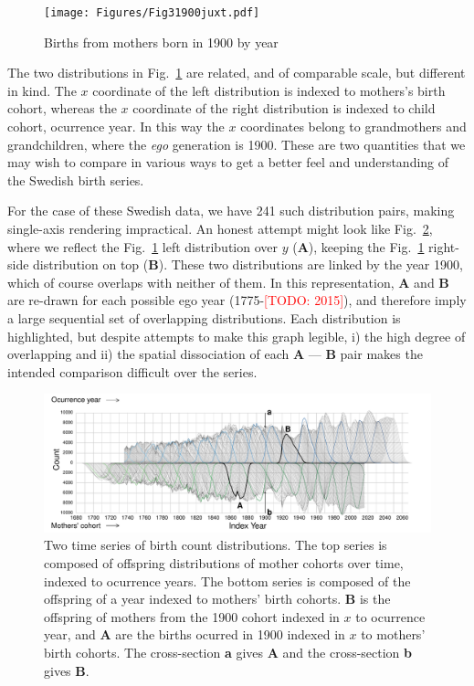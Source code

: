 \documentclass{article}
\renewcommand{\todo}[1]{\textcolor{red}{[TODO: #1]}}
\begin{document}
\begin{figure}[ht!]
 \centering
        \texttt{[image: Figures/Fig31900juxt.pdf]}
        \caption{Births from mothers born in 1900 by year}
          \label{fig:juxt}
\end{figure}

The two distributions in Fig.~\ref{fig:juxt} are related, and of comparable scale, but different in kind. The $x$ coordinate of the left distribution is indexed to mothers's birth cohort, whereas the $x$ coordinate of the right distribution is indexed to child cohort, ocurrence year. In this way the $x$ coordinates belong to grandmothers and grandchildren, where the \emph{ego} generation is 1900. These are two quantities that we may wish to compare in various ways to get a better feel and understanding of the Swedish birth series. 

For the case of these Swedish data, we have 241 such distribution pairs, making single-axis rendering impractical. An honest attempt might look like Fig.~\ref{fig:reflect1}, where we reflect the Fig.~\ref{fig:juxt} left distribution over $y$ (\textbf{A}), keeping the Fig.~\ref{fig:juxt} right-side distribution on top (\textbf{B}). These two distributions are linked by the year 1900, which of course overlaps with neither of them. In this representation, \textbf{A} and \textbf{B} are re-drawn for each possible ego year (1775-\todo{2015}), and therefore imply a large sequential set of overlapping distributions. Each  distribution is highlighted, but despite attempts to make this graph legible, i) the high degree of overlapping and ii) the spatial dissociation of each \textbf{A} --- \textbf{B} pair makes the intended comparison difficult over the series.

\begin{figure}[ht!]
 \centering
        \includegraphics[width=\textwidth]{Figures/FxFlowReflect.pdf}
        \caption{Two time series of birth count distributions. The top series is composed of offspring distributions of mother cohorts over time, indexed to ocurrence years. The bottom series is composed of the offspring of a year indexed to mothers' birth cohorts. \textbf{B} is the offspring of mothers from the 1900 cohort indexed in $x$ to ocurrence year, and \textbf{A} are the births ocurred in 1900 indexed in $x$ to mothers' birth cohorts. The cross-section \textbf{a} gives \textbf{A} and the cross-section \textbf{b} gives \textbf{B}.}
          \label{fig:reflect1}
\end{figure}
\end{document}
